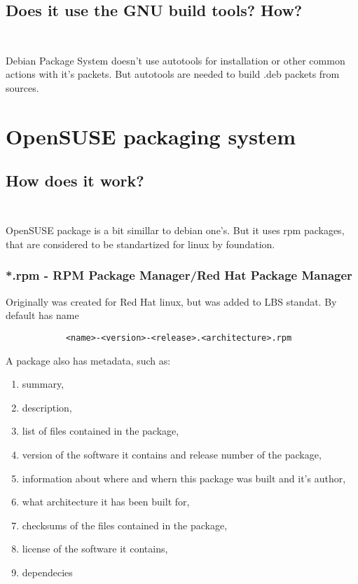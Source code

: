 \documentclass[10pt]{article}
\begin{document}
    \subsection {Does it use the GNU build tools? How? \\ \\}
    Debian Package System doesn't use autotools for installation or other common actions with it's packets. But autotools are needed to build .deb packets from sources.


\section{OpenSUSE packaging system    \newline}

    \subsection {How does it work? \\ \\}
        OpenSUSE package is a bit simillar to debian one's. But it uses rpm packages, that are considered to be standartized for linux by foundation.\newline \newline
        
        \subsubsection*{*.rpm - RPM Package Manager/Red Hat Package Manager}
            Originally was created for Red Hat linux, but was added to LBS standat. By default has name 
            \begin{verbatim}
            <name>-<version>-<release>.<architecture>.rpm
            \end{verbatim}
                A package also has metadata, such as:
                \begin{enumerate}
                    \item summary,
                    \item description,
                    \item list of files contained in the package,
                    \item version of the software it contains and release number of the package,
                    \item information about where and whern this package was built and it's author,
                    \item what architecture it has been built for,
                    \item checksums of the files contained in the package,
                    \item license of the software it contains,
                    \item dependecies
                \end{enumerate}
\end{document}
